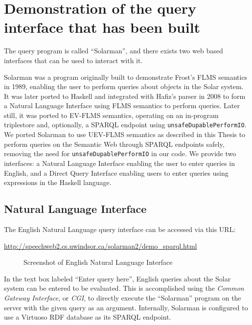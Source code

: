 \documentclass[../main.tex]{subfiles}
\begin{document}
\chapter{Demonstration of the query interface that has been built}
\label{chapter:demonstration}

The query program is called ``Solarman'', and there exists two web based interfaces that can be used to interact with it.

Solarman was a program originally built to demonstrate Frost's FLMS semantics in 1989\cite{frost1989constructing}, enabling the user
to perform queries about objects in the Solar system.  It was later ported to Haskell and integrated with Hafiz's parser in 2008\cite{frosthafiz2008}
to form a Natural Language Interface using FLMS semantics to perform queries.  Later still, it was ported to EV-FLMS semantics, operating on an in-program
triplestore and, optionally, a SPARQL endpoint using \texttt{unsafeDupablePerformIO}.  We ported Solarman to use UEV-FLMS semantics as described in this Thesis to perform queries on the Semantic Web through SPARQL endpoints safely, removing the need for \texttt{unsafeDupablePerformIO} in our code.
We provide two interfaces: a Natural Language Interface enabling the user to enter queries in English, and a Direct Query Interface enabling users
to enter queries using expressions in the Haskell language.

\section{Natural Language Interface}

The English Natural Language query interface can be accessed via this URL:

\url{http://speechweb2.cs.uwindsor.ca/solarman2/demo_sparql.html}


\begin{figure}[h]
\centering
{}
\caption{Screenshot of English Natural Language Interface}
\end{figure}
In the text box labeled ``Enter query here'', English queries about the Solar system can be entered to be evaluated.  This is accomplished using the {\em Common Gateway Interface}, or {\em CGI}, to directly execute the ``Solarman'' program on the server with the given query as an argument.  Internally, Solarman is configured to use a Virtuoso\cite{virtuoso} RDF database as its SPARQL endpoint.
\end{document}
